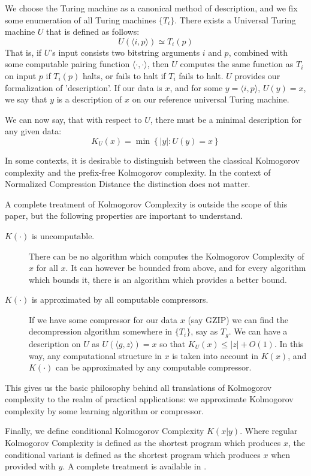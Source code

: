 \documentclass[10pt,a4paper,oneside]{article}
\begin{document}
We choose the Turing machine as a canonical method of description, and we fix some enumeration of all Turing machines $\{T_i\}$. There exists a Universal Turing machine $U$ that is defined as follows:
\[
U(\langle i, p\rangle) \simeq T_i(p)
\] 
That is, if $U$'s input consists two bitstring arguments $i$ and $p$, combined with some computable pairing function $\langle \cdot, \cdot\rangle$, then $U$ computes the same function as $T_i$ on input $p$ if $T_i(p)$ halts, or fails to halt if $T_i$ fails to halt. $U$ provides our formalization of 'description'. If our data is $x$, and for some $y = \langle i, p\rangle$, $U(y) = x$, we say that $y$ is a description of $x$ on our reference universal Turing machine.  

We can now say, that with respect to $U$, there must be a minimal description for any given data:
\[
K_U(x) = \min\left \{|y| : U(y) = x\right\} 
\]

In some contexts, it is desirable to distinguish between the classical Kolmogorov complexity and the prefix-free Kolmogorov complexity. In the context of Normalized Compression Distance the distinction does not matter.

A complete treatment of Kolmogorov Complexity is outside the scope of this paper, but the following properties are important to understand.

\begin{description}
\item[$K(\cdot)$ is uncomputable.] There can be no algorithm which computes the Kolmogorov Complexity of $x$ for all $x$. It can however be bounded from above, and for every algorithm which bounds it, there is an algorithm which provides a better bound. 
\item[$K(\cdot)$ is approximated by all computable compressors.] If we have some compressor for our data $x$ (say GZIP) we can find the decompression algorithm somewhere in $\{T_i\}$, say as $T_g$. We can have a description on $U$ as $U(\langle g, z\rangle) = x$ so that $K_U(x)\leq |z| + O(1)$. In this way, any computational structure in $x$ is taken into account in $K(x)$, and $K(\cdot)$ can be approximated by any computable compressor.
\end{description}

This gives us the basic philosophy behind all translations of Kolmogorov complexity to the realm of practical applications: we approximate Kolmogorov complexity by some learning algorithm or compressor. 

Finally, we define conditional Kolmogorov Complexity $K(x| y)$. Where regular Kolmogorov Complexity is defined as the shortest program which produces $x$, the conditional variant is defined as the shortest program which produces $x$ when provided with $y$. A complete treatment is available in \cite{}.
\end{document}
